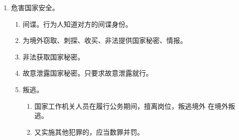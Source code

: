 \begin{enumerate}
\begin{enumerate}
        \end{enumerate}
  \item 危害国家安全。
        \begin{enumerate}
          \item 间谍。行为人知道对方的间谍身份。
          \item 为境外窃取、刺探、收买、非法提供国家秘密、情报。
          \item 非法获取国家秘密。
          \item 故意泄露国家秘密。只要求故意泄露就行。
          \item 叛逃。
                \begin{enumerate}
                  \item 国家工作机关人员在履行公务期间，擅离岗位，叛逃境外 \hz 在境外叛逃。
                  \item 又实施其他犯罪的，应当数罪并罚。
                \end{enumerate}
        \end{enumerate}
\end{enumerate}

